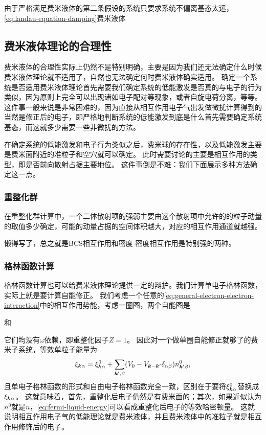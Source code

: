 由于严格满足费米液体的第二条假设的系统只要求系统不偏离基态太远，\eqref{eq:landau-equation-damping}费米液体

\subsection{费米液体理论的合理性}

费米液体的合理性实际上仍然不是特别明确，主要是因为我们还无法确定什么时候费米液体理论就不适用了，自然也无法确定何时费米液体确实适用。
确定一个系统是否适用费米液体理论首先需要我们确定系统的低能激发是否真的与电子的行为类似，因为原则上完全可以出现诸如电子配对等现象，或者自旋电荷分离，等等。
这件事一般来说是非常困难的，因为直接从相互作用电子气出发做微扰计算得到的当然是修正后的电子，即严格地判断系统的低能激发到底是什么首先需要确定系统基态，而这就多少需要一些非微扰的方法。

在确定系统的低能激发和电子行为类似之后，费米球的存在性，以及低能激发主要是费米面附近的准粒子和空穴就可以确定。
此时需要讨论的主要是相互作用的类型，即是否前向散射占据主要地位。
这件事倒是不难：我们下面展示多种方法确定这一点。

\subsubsection{重整化群}

在重整化群计算中，一个二体散射项的强弱主要由这个散射项中允许的的粒子动量的取值多少确定，可能的动量占据的空间体积越大，对应的相互作用通道就越强。

懒得写了，总之就是BCS相互作用和密度-密度相互作用是特别强的两种。

\subsubsection{格林函数计算}

格林函数计算也可以给费米液体理论提供一定的辩护。我们计算单电子格林函数，实际上就是要计算自能修正。
我们考虑一个任意的\eqref{eq:general-electron-electron-interaction}中的相互作用势能，考虑一圈图，两个自能图是

和

它们均没有$\omega$依赖，即重整化因子$Z=1$。
因此对一个做单圈自能修正就够了的费米子系统，等效单粒子能量为
\begin{equation}
    \xi_{\vb*{k} \alpha} = \xi^0_{\vb*{k} \alpha} + \sum_{\vb*{k}', \beta} (V_0 - V_{\vb*{k} - \vb*{k}'} \delta_{\alpha \beta}) n_{\vb*{k}' \beta}^0,
\end{equation}
且单电子格林函数的形式和自由电子格林函数完全一致，区别在于要将$\xi^0_{\vb*{k} \alpha}$替换成$\xi_{\vb*{k} \alpha}$。
这就意味着，首先，重整化后电子仍然是有费米面的；其次，如果近似认为$n^0$就是$n$，\eqref{eq:fermi-liquid-energy}可以看成重整化后电子的等效哈密顿量。
这就说明相互作用电子气的低能理论就是费米液体，并且费米液体中的准粒子就是相互作用修饰后的电子。

